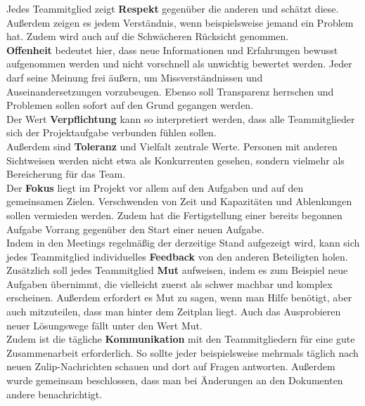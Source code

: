 \documentclass[../review_1.tex]{subfiles}
\begin{document}
Jedes Teammitglied zeigt \textbf{Respekt} gegenüber die anderen und schätzt diese. Außerdem zeigen es jedem Verständnis, wenn beispielsweise jemand ein Problem hat. Zudem wird auch auf die Schwächeren Rücksicht genommen.\\
\textbf{Offenheit} bedeutet hier, dass neue Informationen und Erfahrungen bewusst aufgenommen werden und nicht vorschnell als unwichtig bewertet werden. Jeder darf seine Meinung frei äußern, um Missverständnissen und Auseinandersetzungen vorzubeugen. Ebenso soll Transparenz herrschen und Problemen sollen sofort auf den Grund gegangen werden. \\
Der Wert \textbf{Verpflichtung} kann so interpretiert werden, dass alle Teammitglieder sich der Projektaufgabe verbunden fühlen sollen.\\
Außerdem sind \textbf{Toleranz} und Vielfalt zentrale Werte. Personen mit anderen Sichtweisen werden nicht etwa als Konkurrenten gesehen, sondern vielmehr als Bereicherung für das Team.\\
Der \textbf{Fokus} liegt im Projekt vor allem auf den Aufgaben und auf den gemeinsamen Zielen. Verschwenden von Zeit und Kapazitäten und Ablenkungen sollen vermieden werden. Zudem hat die Fertigstellung einer bereits begonnen Aufgabe Vorrang gegenüber den Start einer neuen Aufgabe.\\
Indem in den Meetings regelmäßig der derzeitige Stand aufgezeigt wird, kann sich jedes Teammitglied individuelles \textbf{Feedback} von den anderen Beteiligten holen.\\
Zusätzlich soll jedes Teammitglied \textbf{Mut} aufweisen, indem es zum Beispiel neue Aufgaben übernimmt, die vielleicht zuerst als schwer machbar und komplex erscheinen. Außerdem erfordert es Mut zu sagen, wenn man Hilfe benötigt, aber auch mitzuteilen, dass man hinter dem Zeitplan liegt. Auch das Ausprobieren neuer Lösungswege fällt unter den Wert Mut.\\
Zudem ist die tägliche \textbf{Kommunikation} mit den Teammitgliedern für eine gute Zusammenarbeit erforderlich. So sollte jeder beispielsweise mehrmals täglich nach neuen Zulip-Nachrichten schauen und dort auf Fragen antworten. Außerdem wurde gemeinsam beschlossen, dass man bei Änderungen an den Dokumenten andere benachrichtigt.
\end{document}
